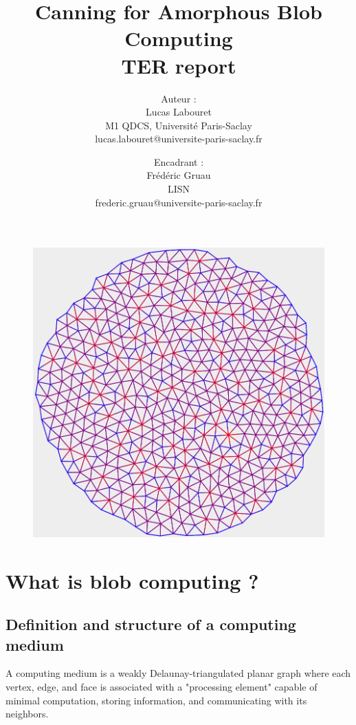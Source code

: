 \documentclass{article}
\title{
	Canning for Amorphous Blob Computing\\
	\small TER report
}
\author{
    Auteur :\\
    Lucas Labouret\\
    M1 QDCS, Université Paris-Saclay\\
    \small lucas.labouret@universite-paris-saclay.fr
    \and
    Encadrant :\\
    Frédéric Gruau\\
    LISN\\
    \small frederic.gruau@universite-paris-saclay.fr
}
\date{}
\begin{document}
 
\maketitle

\begin{figure}[H]
	\centering\includegraphics[width=0.9\linewidth]{assets/Circle500.png}
\end{figure}

\newpage
\tableofcontents
\newpage

\renewcommand{\thesection}{\Alph{section}}

\section{What is blob computing ?}

\subsection{Definition and structure of a computing medium}

A computing medium is a weakly Delaunay-triangulated planar graph where each vertex, edge, and face is associated with a "processing element" capable of minimal computation, storing information, and communicating with its neighbors.
\end{document}

